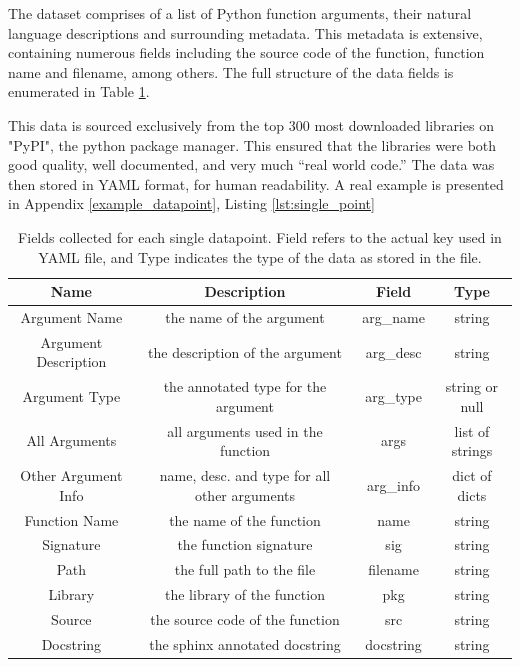 The dataset comprises of a list of Python function arguments, their natural language descriptions and surrounding metadata. 
This metadata is extensive, containing numerous fields including the source code of the function, function name and filename, among others. 
The full structure of the data fields is enumerated in Table \ref{table:metadata}. 

This data is sourced exclusively from the top 300 most downloaded libraries on "PyPI", the python package manager. 
This ensured that the libraries were both good quality, well documented, and very much ``real world code.''
The data was then stored in YAML format, for human readability. 
A real example is presented in Appendix \ref{example_datapoint}, Listing \ref{lst:single_point}


\begin{table}[h!]
    \begin{center}
    \begin{tabular}{| c | c | c | c |}
        \hline
        Name &  Description     &    Field    & Type  \\
        \hline
        Argument Name & the name of the argument  & arg\_name & string \\
        Argument Description & the description of the argument & arg\_desc & string \\
        Argument Type & the annotated type for the argument & arg\_type & string or null \\
        All Arguments & all arguments used in the function & args & list of strings \\
        Other Argument Info & name, desc. and type for all other arguments & arg\_info & dict of dicts\\
        Function Name & the name of the function & name & string\\
        Signature & the function signature & sig & string\\
        Path & the full path to the file & filename & string \\
        Library & the library of the function & pkg & string\\
        Source & the source code of the function & src & string\\
        Docstring & the sphinx annotated docstring & docstring & string\\

        \hline


    \end{tabular}
    \caption {Fields collected for each single datapoint. Field refers to the actual key used in YAML file, and Type indicates the type of the data as stored in the file.}
    \label{table:metadata}
    \end{center}
\end{table}


